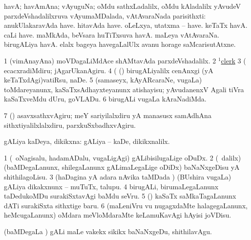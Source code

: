 \bentry
{} 
\gl{\nA}
\expl{}
\bmng
havA; havAmAna; vAyuguNa; oMdu sathxLadalilx, oMdu kAladalilx yAvudeV parxdeVshadalilxruva vAyumaMDalada, vAtAvaraNada parisithxti:  anukUlakaravAda have.  hitavAda have.  oLeLxya, utatxma -- have.  keTaTx havA.  caLi have.  maMkAda, beVsara huTiTxsuva havA.  maLeya vAtAvaraNa.  birugALiya havA.  elalx bageya havegaLalUlx avanu horage saMcarisutAtxne. 
\emng

\noindent 
\gl{\pagu}
\expl{}
\bmng
\bnum
\num{1}  (vimAnayAna) moVDagaLiMdAce shAMtavAda parxdeVshadalilx. 
\num{2} \hyperref{kandict_c.pdf}{C}{clerk(1) pagu(3)}{$^1$clerk}  
\num{3}  (  ecacxradiMdiru; jAgarUkanAgiru. 
\num{4}  (  (\nw) birugALiyalilx cenAnxgi (yA keTaTxdAgi)vatiRsu, naDe. 
\num{5}  (samaseyx, kAyARcaraNe, \mo vugaLa) toMdareyanunx, kaSaTxsAdhayxteyanunx atishayisu; yAvudanenxV Agali tiVra kaSaTxveMdu dUru, goVLADu. 
\num{6}  birugALi \mo vugaLa kAraNadiMda. 
\num{7}  (\AmA) asavxsathxvAgiru; meY sariyilalxdiru yA manasusx samAdhAna sithxtiyalilxlalxdiru, parxkuSxbadhxvAgiru. 
\enum
\emng
\eentry

\bentry
{} 
\gl{\gu}
\expl{}
\bmng
gALiya kaDeya, dikikxna:  gALiya -- kaDe, dikikxnalilx. 
\emng
\eentry

\bentry
{} 
\gl{\sakirx}
\expl{}
\bmng
\bnum
\num{1} (\kanmu\ oNagisalu, hadamADalu, \mo vugaLigAgi) gALibisilugaLige oDuDx. 
\num{2} (\sA\ \kaparx dalilx) (baMDegaLanunx, shilegaLanunx gALimaLegaLige oDiDx) baNaNxgeDisu yA shithilagoLisu. 
\num{3} (haDagina yA adara nAvika taMDada \vi) (BUshira \mo vugaLa) gALiya dikakxnunx -- muTuTx, talupu. 
\num{4} birugALi, birumaLegaLanunx taDedukoMDu surakiSxtavAgi baMdu seVru. 
\num{5} (\rUpa) kaSaTx saMkaTagaLanunx dATi surakiSxta sithxtige baru. 
\num{6} (maLeniVru \mo vu nugagxdaMte halagegaLanunx, heMcugaLanunx) oMdara meVloMdaraMte keLamuKavAgi hAyisi joVDisu. 
\enum
\emng

\noindent 
\gl{\akirx}
\expl{}
\bmng
(baMDegaLa \vi) gALi maLe \mo vakekx sikikx baNaNxgeDu, shithilavAgu. 
\emng
\eentry

